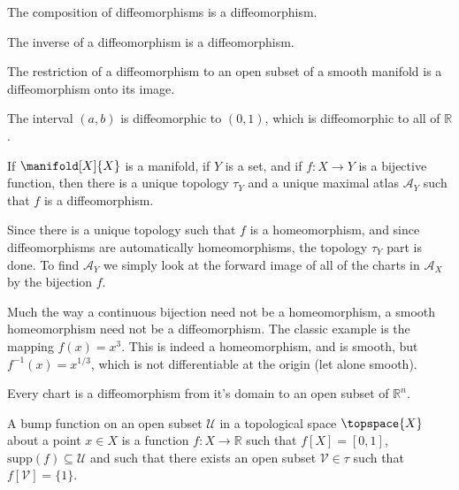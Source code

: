 \documentclass{article}                                                        %
\begin{document}
            \begin{theorem}
                The composition of diffeomorphisms is a diffeomorphism.
            \end{theorem}
            \begin{theorem}
                The inverse of a diffeomorphism is a diffeomorphism.
            \end{theorem}
            \begin{theorem}
                The restriction of a diffeomorphism to an open subset of a
                smooth manifold is a diffeomorphism onto its image.
            \end{theorem}
            \begin{example}
                The interval $(a,b)$ is diffeomorphic to $(0,1)$, which is
                diffeomorphic to all of $\mathbb{R}$.
            \end{example}
            \begin{theorem}
                If $\manifold[X]{X}$ is a manifold, if $Y$ is a set, and if
                $f:X\rightarrow{Y}$ is a bijective function, then there is a
                unique topology $\tau_{Y}$ and a unique maximal atlas
                $\mathcal{A}_{Y}$ such that $f$ is a diffeomorphism.
            \end{theorem}
            Since there is a unique topology such that $f$ is a homeomorphism,
            and since diffeomorphisms are automatically homeomorphisms, the
            topology $\tau_{Y}$ part is done. To find $\mathcal{A}_{Y}$ we
            simply look at the forward image of all of the charts in
            $\mathcal{A}_{X}$ by the bijection $f$.
            \begin{example}
                Much the way a continuous bijection need not be a homeomorphism,
                a smooth homeomorphism need not be a diffeomorphism. The classic
                example is the mapping $f(x)=x^{3}$. This is indeed a
                homeomorphism, and is smooth, but $f^{\minus{1}}(x)=x^{1/3}$,
                which is not differentiable at the origin (let alone smooth).
            \end{example}
            Every chart is a diffeomorphism from it's domain to an open subset
            of $\mathbb{R}^{n}$.
            \begin{definition}
                A bump function on an open subset $\mathcal{U}$ in a topological
                space $\topspace{X}$ about a point $x\in{X}$ is a function
                $f:X\rightarrow\mathbb{R}$ such that $f[X]=[0,1]$,
                $\textrm{supp}(f)\subseteq\mathcal{U}$ and such that there
                exists an open subset $\mathcal{V}\in\tau$ such that
                $f[\mathcal{V}]=\{1\}$.
            \end{definition}
\end{document}
